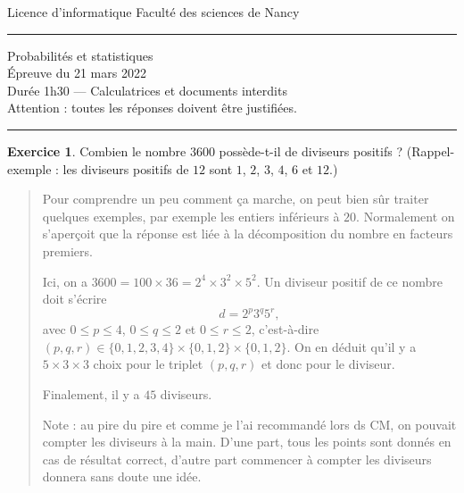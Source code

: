 \documentclass[11pt]{article}
\theoremstyle{definition}
\newtheorem{exo}{Exercice}
\newenvironment{solution}{\begin{quote}\color{teal}}{\end{quote}}
\begin{document}
\noindent Licence d'informatique \hfill Faculté des sciences de Nancy\\
\noindent\rule{\linewidth}{1pt}
\begin{center}
Probabilités et statistiques\\
Épreuve du 21 mars 2022\\
Durée 1h30 --- Calculatrices et documents interdits\\
Attention : toutes les réponses doivent être justifiées.
\end{center}
\noindent\rule{\linewidth}{1pt}








\begin{exo}
Combien le nombre $3600$ possède-t-il de diviseurs positifs ? (Rappel-exemple : les diviseurs positifs de $12$ sont $1$, $2$, $3$, $4$, $6$ et $12$.)

\begin{solution}
Pour comprendre un peu comment ça marche, on peut bien sûr traiter quelques exemples, par exemple les entiers inférieurs à $20$. Normalement on s'aperçoit que la réponse est liée à la décomposition du nombre en facteurs premiers.

Ici, on a $3600=100\times 36=2^4\times 3^2\times 5^2$. Un diviseur positif de ce nombre doit s'écrire 
\[ d= 2^p3^q5^r,\]
avec $0\leq p\leq 4$, $0\leq q\leq 2$ et $0\leq r\leq 2$, c'est-à-dire $(p,q,r) \in \{0,1,2,3,4\}\times\{0,1,2\}\times \{0,1,2\}$. On en déduit qu'il y a $5\times 3\times 3$ choix pour le triplet $(p,q,r)$ et donc pour le diviseur.

Finalement, il y a $45$ diviseurs.

Note : au pire du pire et comme je l'ai recommandé lors ds CM, on pouvait compter les diviseurs à la main. D'une part, tous les points sont donnés en cas de résultat correct, d'autre part commencer à compter les diviseurs  donnera sans doute une idée.
\end{solution}
\end{exo}
\end{document}
